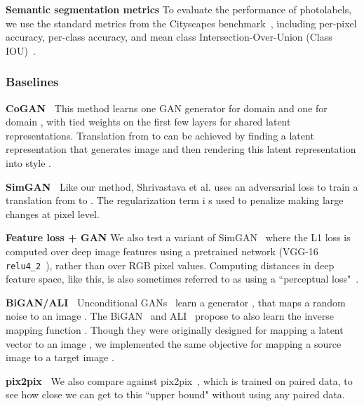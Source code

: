 \documentclass[10pt,twocolumn,letterpaper]{article}
\newcommand{\shortcite}[1]{\cite{#1}}
\begin{document}
{\bf Semantic segmentation metrics} To evaluate the performance of photolabels, we use the standard metrics from the Cityscapes benchmark~\cite{Cordts2016Cityscapes}, including per-pixel accuracy, per-class accuracy, and mean class Intersection-Over-Union (Class IOU)~\cite{Cordts2016Cityscapes}.

\vspace{-1 mm}
\subsubsection{Baselines}
\vspace{-1 mm}

\hspace{4mm} {\bf CoGAN~\cite{liu2016coupled}} This method learns one GAN generator for domain  and one for domain , with tied weights on the first few layers for shared latent representations. Translation from  to  can be achieved by finding a latent representation that generates image  and then rendering this latent representation into style .


{\bf SimGAN~\cite{shrivastava2016learning}} Like our method, Shrivastava et al.\shortcite{shrivastava2016learning} uses an adversarial loss to train a translation from  to . The regularization term  i s used to penalize making large changes at pixel level.

{\bf Feature loss + GAN} We also test a variant of SimGAN~\cite{shrivastava2016learning} where the L1 loss is computed over deep image features using a pretrained network (VGG-16 \texttt{relu4\_2}~\cite{simonyan2014very}), rather than over RGB pixel values. Computing distances in deep feature space, like this, is also sometimes referred to as using a ``perceptual loss"~\cite{dosovitskiy2016generating,johnson2016perceptual}.

{\bf BiGAN/ALI~\cite{dumoulin2016adversarially,donahue2016adversarial}} Unconditional GANs~\cite{goodfellow2014generative} learn a generator , that maps a random noise  to an image . The BiGAN~\cite{dumoulin2016adversarially} and ALI~\cite{donahue2016adversarial} propose to also learn the inverse mapping function . Though they were originally designed for mapping a latent vector  to an image , we implemented the same objective for mapping a source image  to a target image .

{\bf pix2pix~\cite{isola2016image}} We also compare against pix2pix~\cite{isola2016image}, which is trained on paired data, to see how close we can get to this ``upper bound" without using any paired data. 
\end{document}
